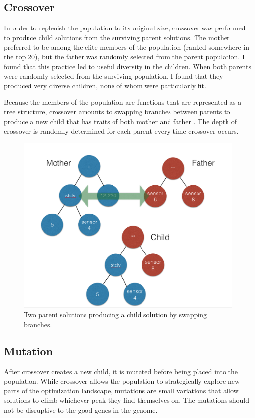 \documentclass{acm_proc_article-sp}
\begin{document}
\subsection{Crossover}
In order to replenish the population to its original size, crossover was performed to produce child solutions from the surviving parent solutions. The mother preferred to be among the elite members of the population (ranked somewhere in the top 20), but the father was randomly selected from the parent population. I found that this practice led to useful diversity in the children. When both parents were randomly selected from the surviving population, I found that they produced very diverse children, none of whom were particularly fit.

Because the members of the population are functions that are represented as a tree structure, crossover amounts to swapping branches between parents to produce a new child that has traits of both mother and father \cite{symbolic}. The depth of crossover is randomly determined for each parent every time crossover occurs.

\begin{figure}[!h]
\center
\includegraphics[scale=0.25]{crossover.png}
\caption {Two parent solutions producing a child solution by swapping branches.}
\label{fig:bullet}
\end{figure}

\subsection{Mutation}
After crossover creates a new child, it is mutated before being placed into the population. While crossover allows the population to strategically explore new parts of the optimization landscape, mutations are small variations that allow solutions to climb whichever peak they find themselves on. The mutations should not be disruptive to the good genes in the genome.
\end{document}
